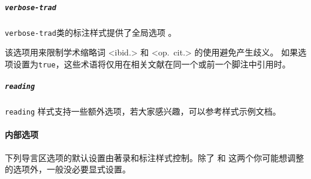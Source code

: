 
\subparagraph{\texttt{verbose-trad}} \texttt{verbose-trad}类的标注样式提供了全局选项 。

\begin{optionlist}



该选项用来限制学术缩略词  <ibid.> 和 <op.~cit.> 的使用避免产生歧义。
如果选项设置为\texttt{true}，这些术语将仅用在相关文献在同一个或前一个脚注中引用时。

\end{optionlist}


\subparagraph{\texttt{reading}} \texttt{reading} 样式支持一些额外选项，若大家感兴趣，可以参考样式示例文档。


\paragraph{内部选项}%
\label{use:opt:pre:int}

下列导言区选项的默认设置由著录和标注样式控制。除了  和  这两个你可能想调整的选项外，一般没必要显式设置。

